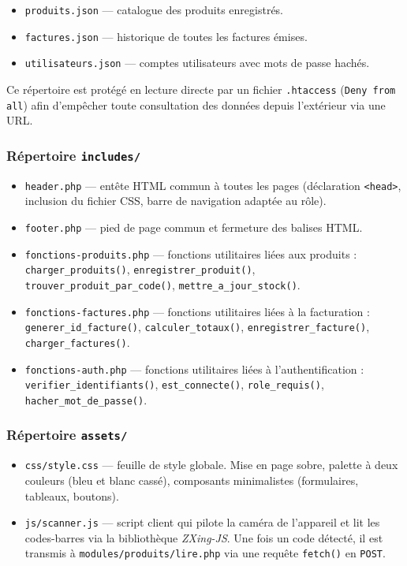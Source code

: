 \documentclass[12pt,a4paper]{article}
\begin{document}
\begin{itemize}[leftmargin=1.5em]
    \item \texttt{produits.json} --- catalogue des produits enregistrés.
    \item \texttt{factures.json} --- historique de toutes les factures émises.
    \item \texttt{utilisateurs.json} --- comptes utilisateurs avec mots de passe hachés.
\end{itemize}

Ce répertoire est protégé en lecture directe par un fichier \texttt{.htaccess} (\texttt{Deny from all}) afin d'empêcher toute consultation des données depuis l'extérieur via une URL.

\subsubsection{Répertoire \texttt{includes/}}

\begin{itemize}[leftmargin=1.5em]
    \item \texttt{header.php} --- entête HTML commun à toutes les pages (déclaration \texttt{<head>}, inclusion du fichier CSS, barre de navigation adaptée au rôle).
    \item \texttt{footer.php} --- pied de page commun et fermeture des balises HTML.
    \item \texttt{fonctions-produits.php} --- fonctions utilitaires liées aux produits : \texttt{charger\_produits()}, \texttt{enregistrer\_produit()}, \texttt{trouver\_produit\_par\_code()}, \texttt{mettre\_a\_jour\_stock()}.
    \item \texttt{fonctions-factures.php} --- fonctions utilitaires liées à la facturation : \texttt{generer\_id\_facture()}, \texttt{calculer\_totaux()}, \texttt{enregistrer\_facture()}, \texttt{charger\_factures()}.
    \item \texttt{fonctions-auth.php} --- fonctions utilitaires liées à l'authentification : \texttt{verifier\_identifiants()}, \texttt{est\_connecte()}, \texttt{role\_requis()}, \texttt{hacher\_mot\_de\_passe()}.
\end{itemize}

\subsubsection{Répertoire \texttt{assets/}}

\begin{itemize}[leftmargin=1.5em]
    \item \texttt{css/style.css} --- feuille de style globale. Mise en page sobre, palette à deux couleurs (bleu et blanc cassé), composants minimalistes (formulaires, tableaux, boutons).
    \item \texttt{js/scanner.js} --- script client qui pilote la caméra de l'appareil et lit les codes-barres via la bibliothèque \textit{ZXing-JS}. Une fois un code détecté, il est transmis à \texttt{modules/produits/lire.php} via une requête \texttt{fetch()} en \texttt{POST}.
\end{itemize}
\end{document}
